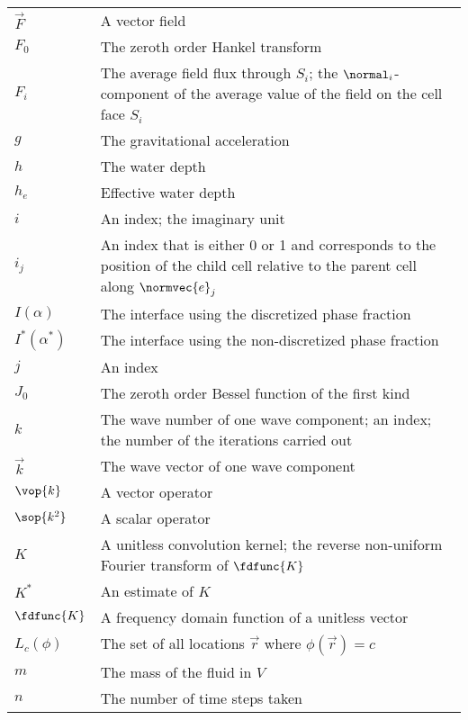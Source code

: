{\begin{center}
\begin{longtabu}{l X}
    $\vec{F}$           & A vector field \\
    $F_0$               & The zeroth order Hankel transform \\
    $F_i$               & The average field flux through $S_i$;
                          the $\normal_i$-component of the average value of the field on
                          the cell face $S_i$ \\
    $g$                 & The gravitational acceleration \\
    $h$                 & The water depth \\
    $h_e$               & Effective water depth \\
    $i$                 & An index; the imaginary unit \\
    $i_j$               & An index that is either 0 or 1 and corresponds to the position of the
                          child cell relative to the parent cell along $\normvec{e}_j$ \\
    $I(\alpha)$         & The interface using the discretized phase fraction \\
    $I^*(\alpha^*)$     & The interface using the non-discretized phase fraction \\
    $j$                 & An index \\
    $J_0$               & The zeroth order Bessel function of the first kind \\
    $k$                 & The wave number of one wave component; an index;
                          the number of the iterations carried out \\
    $\vec{k}$           & The wave vector of one wave component \\
    $\vop{k}$           & A vector operator \\
    $\sop{k^2}$         & A scalar operator \\
    $K$                 & A unitless convolution kernel;
                          the reverse non-uniform Fourier transform of $\fdfunc{K}$ \\
    $K^*$               & An estimate of $K$ \\
    $\fdfunc{K}$        & A frequency domain function of a unitless vector \\
    $L_c(\phi)$         & The set of all locations $\vec{r}$ where $\phi(\vec{r}) = c$ \\
    $m$                 & The mass of the fluid in $V$ \\
    $n$                 & The number of time steps taken \\

\end{longtabu}
\end{center}}
